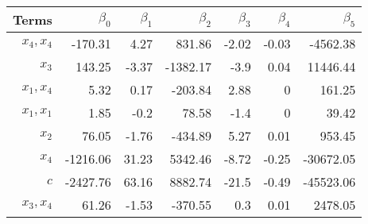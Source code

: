 \begin{tabular}{rrrrrrr}
Terms & $\beta_0$ & $\beta_1$ & $\beta_2$ & $\beta_3$ & $\beta_4$ & $\beta_5$ \\ 
\hline 
$x_4,x_4$ & -170.31 & 4.27 & 831.86 & -2.02 & -0.03 & -4562.38 \\ 
$x_3$ & 143.25 & -3.37 & -1382.17 & -3.9 & 0.04 & 11446.44 \\ 
$x_1,x_4$ & 5.32 & 0.17 & -203.84 & 2.88 & 0 & 161.25 \\ 
$x_1,x_1$ & 1.85 & -0.2 & 78.58 & -1.4 & 0 & 39.42 \\ 
$x_2$ & 76.05 & -1.76 & -434.89 & 5.27 & 0.01 & 953.45 \\ 
$x_4$ & -1216.06 & 31.23 & 5342.46 & -8.72 & -0.25 & -30672.05 \\ 
$c$ & -2427.76 & 63.16 & 8882.74 & -21.5 & -0.49 & -45523.06 \\ 
$x_3,x_4$ & 61.26 & -1.53 & -370.55 & 0.3 & 0.01 & 2478.05 \\ 
\hline 
\end{tabular}